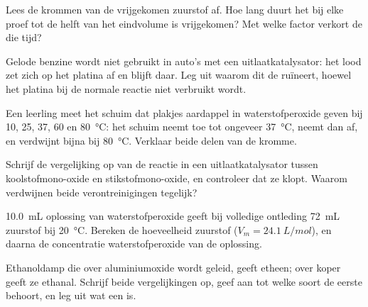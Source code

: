 \begin{exercise}[$\star\star$]\label{exo:g12:catalysis:7}
Lees de krommen van de vrijgekomen zuurstof af. Hoe lang duurt het bij
elke proef tot de helft van het eindvolume is vrijgekomen? Met welke
factor verkort de  die tijd?
\end{exercise}

\begin{exercise}[$\star\star$]\label{exo:g12:catalysis:8}
Gelode benzine wordt niet gebruikt in auto's met een uitlaatkatalysator:
het lood zet zich op het platina af en blijft daar. Leg uit waarom dit de
 ruïneert, hoewel het platina bij de normale reactie niet
verbruikt wordt.
\end{exercise}

\begin{exercise}[$\star\star$]\label{exo:g12:catalysis:9}
Een leerling meet het schuim dat plakjes aardappel in waterstofperoxide
geven bij 10, 25, 37, 60 en \qty{80}{\celsius}: het schuim neemt toe tot
ongeveer \qty{37}{\celsius}, neemt dan af, en verdwijnt bijna bij
\qty{80}{\celsius}. Verklaar beide delen van de kromme.
\end{exercise}

\begin{exercise}[$\star\star$]\label{exo:g12:catalysis:10}
Schrijf de vergelijking op van de reactie in een uitlaatkatalysator tussen
koolstofmono-oxide en stikstofmono-oxide, en controleer dat ze klopt.
Waarom verdwijnen beide verontreinigingen tegelijk?
\end{exercise}

\begin{exercise}[$\star\star$]\label{exo:g12:catalysis:11}
\qty{10.0}{mL} oplossing van waterstofperoxide geeft bij volledige
ontleding \qty{72}{mL} zuurstof bij \qty{20}{\celsius}. Bereken de
hoeveelheid zuurstof ($V_m = \qty{24.1}{L/mol}$), en daarna de
concentratie waterstofperoxide van de oplossing.
\end{exercise}

\begin{exercise}[$\star\star\star$]\label{exo:g12:catalysis:12}
Ethanoldamp die over aluminiumoxide wordt geleid, geeft etheen; over koper
geeft ze ethanal. Schrijf beide vergelijkingen op, geef aan tot welke
soort de eerste behoort, en leg uit wat een  is.
\end{exercise}

